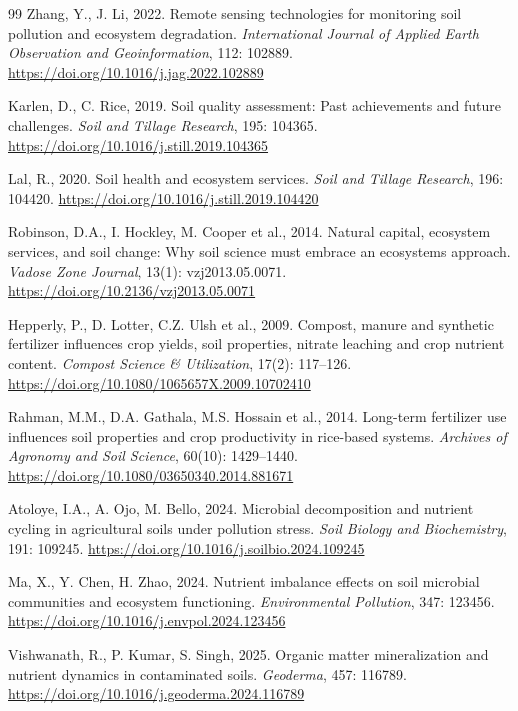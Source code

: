\documentclass[sn-mathphys-num]{sn-jnl}
\begin{document}
\begin{thebibliography}{99}
Zhang, Y., J. Li, 2022.
Remote sensing technologies for monitoring soil pollution and ecosystem
degradation.
\textit{International Journal of Applied Earth Observation and
Geoinformation}, 112: 102889.
\url{https://doi.org/10.1016/j.jag.2022.102889}

Karlen, D., C. Rice, 2019.
Soil quality assessment: Past achievements and future challenges.
\textit{Soil and Tillage Research}, 195: 104365.
\url{https://doi.org/10.1016/j.still.2019.104365}

Lal, R., 2020.
Soil health and ecosystem services.
\textit{Soil and Tillage Research}, 196: 104420.
\url{https://doi.org/10.1016/j.still.2019.104420}

Robinson, D.A., I. Hockley, M. Cooper et al., 2014.
Natural capital, ecosystem services, and soil change: Why soil science must
embrace an ecosystems approach.
\textit{Vadose Zone Journal}, 13(1): vzj2013.05.0071.
\url{https://doi.org/10.2136/vzj2013.05.0071}

Hepperly, P., D. Lotter, C.Z. Ulsh et al., 2009.
Compost, manure and synthetic fertilizer influences crop yields, soil
properties, nitrate leaching and crop nutrient content.
\textit{Compost Science \& Utilization}, 17(2): 117--126.
\url{https://doi.org/10.1080/1065657X.2009.10702410}

Rahman, M.M., D.A. Gathala, M.S. Hossain et al., 2014.
Long-term fertilizer use influences soil properties and crop productivity in
rice-based systems.
\textit{Archives of Agronomy and Soil Science}, 60(10): 1429--1440.
\url{https://doi.org/10.1080/03650340.2014.881671}

Atoloye, I.A., A. Ojo, M. Bello, 2024.
Microbial decomposition and nutrient cycling in agricultural soils under
pollution stress.
\textit{Soil Biology and Biochemistry}, 191: 109245.
\url{https://doi.org/10.1016/j.soilbio.2024.109245}

Ma, X., Y. Chen, H. Zhao, 2024.
Nutrient imbalance effects on soil microbial communities and ecosystem
functioning.
\textit{Environmental Pollution}, 347: 123456.
\url{https://doi.org/10.1016/j.envpol.2024.123456}

Vishwanath, R., P. Kumar, S. Singh, 2025.
Organic matter mineralization and nutrient dynamics in contaminated soils.
\textit{Geoderma}, 457: 116789.
\url{https://doi.org/10.1016/j.geoderma.2024.116789}


\end{thebibliography}
\end{document}
